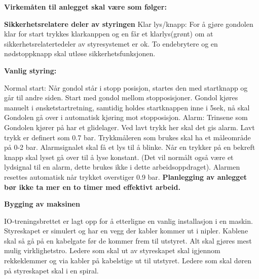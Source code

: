 {\bf Virkemåten til anlegget skal  være som følger:}
\vskip 10pt 

{\bf Sikkerhetsrelatere deler av styringen}
\vskip 10pt
Klar lys/knapp: For å gjøre gondolen klar for start trykkes klarkanppen og en får et klarlys(grønt) om at sikkerhetsrelatertedeler av styresystemet er ok. To endebrytere og en nødstoppknapp skal utløse sikkerhetsfunksjonen. 
\vskip 10pt 

\textbf{Vanlig styring:}
\vskip 10pt 

Normal start: Når gondol står i stopp posisjon, startes den med startknapp og går til andre siden.
\vskip 10pt 
Start med gondol mellom stopposisjoner. Gondol kjøres manuelt i ønsketstartretning, samtidig holdes startknappen inne i 5sek, nå skal Gondolen gå over i automatisk kjøring mot stopposisjon.
\vskip 10pt 
Alarm: Trinsene som Gondolen kjører på har et glidelager. Ved lavt trykk her skal det gis alarm. Lavt trykk er definert som 0.7 bar. Trykkmåleren som brukes skal ha et måleområde på 0-2 bar. Alarmsignalet skal få et lys til å blinke. Når en trykker på en bekreft knapp skal lyset gå over til å lyse konstant. (Det vil normålt også være et lydsignal til en alarm, dette brukes ikke i dette arbeidsoppdraget). Alarmen resettes automatisk når trykket overstiger 0.9 bar. 
\vskip 10pt 
{\bf Planlegging av anlegget bør ikke ta mer en to timer med effektivt arbeid. }
\vfil \eject

\noindent
{\bf Bygging av maksinen}

\vskip 5pt

IO-treningsbrettet er lagt opp for å etterligne en vanlig installasjon i en maskin. Styreskapet er simulert og har en vegg der kabler kommer ut i nipler. Kablene skal så gå på en kabelgate før de kommer frem til utstyret. Alt skal gjøres mest mulig virklighetstro. Ledere som skal ut av styreskapet skal igjennom rekkeklemmer og via kabler på kabelstige ut til utstyret. Ledere som skal døren på styreskapet skal i en spiral. 



